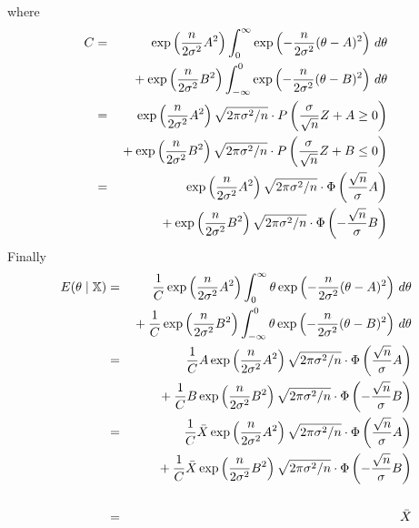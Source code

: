 where
\begin{eqnarray*}
C&=&
\exp\left({n\over2\sigma^2}A^2\right)
\int_0^\infty\exp\left(-{n\over2\sigma^2}(\theta-A)^2\right)\,d\theta\\
&&{}+
\exp\left({n\over2\sigma^2}B^2\right)
\int_{-\infty}^0\exp\left(-{n\over2\sigma^2}(\theta-B)^2\right)\,d\theta\\
&=&
\exp\left({n\over2\sigma^2}A^2\right)
\sqrt{2\pi\sigma^2/n}\cdot
P\left({\sigma\over\sqrt n}Z+A\ge0\right)\\
&&{}+
\exp\left({n\over2\sigma^2}B^2\right)
\sqrt{2\pi\sigma^2/n}\cdot
P\left({\sigma\over\sqrt n}Z+B\le0\right)\\
&=&
\exp\left({n\over2\sigma^2}A^2\right)
\sqrt{2\pi\sigma^2/n}\cdot
\Phi\left({\sqrt n\over\sigma}A\right)\\
&&{}+
\exp\left({n\over2\sigma^2}B^2\right)
\sqrt{2\pi\sigma^2/n}\cdot
\Phi\left(-{\sqrt n\over\sigma}B\right)\\
\end{eqnarray*}
%
Finally
\begin{eqnarray*}
E(\theta\mid\mathbb X)&=&
{1\over C}
\exp\left({n\over2\sigma^2}A^2\right)
\int_0^\infty\theta\exp\left(-{n\over2\sigma^2}(\theta-A)^2\right)
\,d\theta
\\
&&{}+
{1\over C}
\exp\left({n\over2\sigma^2}B^2\right)
\int_{-\infty}^0
\theta
\exp\left(-{n\over2\sigma^2}(\theta-B)^2\right)
\,d\theta\\
%
&=&
{1\over C}
A\exp\left({n\over2\sigma^2}A^2\right)
\sqrt{2\pi\sigma^2/n}
\cdot\Phi\left({\sqrt n\over\sigma}A\right)\\
&&{}+
{1\over C}
B\exp\left({n\over2\sigma^2}B^2\right)
\sqrt{2\pi\sigma^2/n}
\cdot\Phi\left(-{\sqrt n\over\sigma}B\right)\\
%
&=&
{1\over C}
\bar X\exp\left({n\over2\sigma^2}A^2\right)
\sqrt{2\pi\sigma^2/n}
\cdot\Phi\left({\sqrt n\over\sigma}A\right)\\
&&{}+
{1\over C}
\bar X\exp\left({n\over2\sigma^2}B^2\right)
\sqrt{2\pi\sigma^2/n}
\cdot\Phi\left(-{\sqrt n\over\sigma}B\right)\\
\\
&=&\bar X
\end{eqnarray*}

